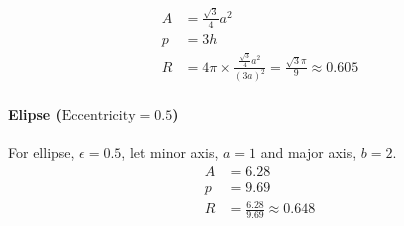 \begin{align}
	A &= \frac{\sqrt{3}}{4}a^2 \\
	p &= 3h \\
	R &= 4\pi \times \frac{\frac{\sqrt{3}}{4}a^2}{(3a)^2} = \frac{\sqrt{3}\pi}{9} \approx 0.605
\end{align}

\paragraph{Elipse ($\textrm{Eccentricity} = 0.5$)}
\label{par:elipse}

For ellipse, $\epsilon = 0.5$, let minor axis, $a = 1$ and major axis, $b = 2$.
\begin{align}
	A &= 6.28 \\
	p &= 9.69 \\
	R &= \frac{6.28}{9.69} \approx 0.648
\end{align}
